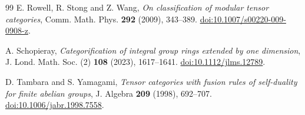 \documentclass[11pt]{amsart}
\theoremstyle{definition}
\numberwithin{equation}{section}
\begin{document}
\begin{thebibliography}{99}
E. Rowell, R. Stong and Z. Wang,
\emph{On classification of modular tensor categories},
Comm. Math. Phys. \textbf{292} (2009), 343--389.
\href{https://doi.org/10.1007/s00220-009-0908-z}{doi:10.1007/s00220-009-0908-z}.

A. Schopieray,
\emph{Categorification of integral group rings extended by one dimension},
J. Lond. Math. Soc. (2) \textbf{108} (2023), 1617--1641.
\href{https://doi.org/10.1112/jlms.12789}{doi:10.1112/jlms.12789}.

D. Tambara and S. Yamagami,
\emph{Tensor categories with fusion rules of self-duality for finite abelian groups},
J. Algebra \textbf{209} (1998), 692--707.
\href{https://doi.org/10.1006/jabr.1998.7558}{doi:10.1006/jabr.1998.7558}.

\end{thebibliography}
\end{document}
